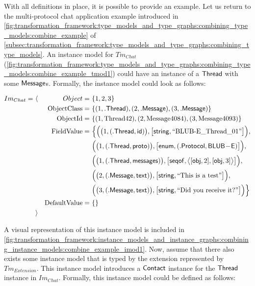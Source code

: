 With all definitions in place, it is possible to provide an example. Let us return to the multi-protocol chat application example introduced in \cref{fig:transformation_framework:type_models_and_type_graphs:combining_type_models:combine_example} of \cref{subsec:transformation_framework:type_models_and_type_graphs:combining_type_models}. An instance model for $Tm_{Chat}$ (\cref{fig:transformation_framework:type_models_and_type_graphs:combining_type_models:combine_example_tmod1}) could have an instance of a $\mathsf{Thread}$ with some $\mathsf{Message}$s. Formally, the instance model could look as follows:

\begin{align*}
Im_{Chat} =\ &\langle&
Object =\ &\{ 1, 2, 3 \} \\&&
\mathrm{ObjectClass} =\ &\{
( 1, \mathsf{.Thread} ),
( 2, \mathsf{.Message} ),
( 3, \mathsf{.Message} )
\} \\&&
\mathrm{ObjectId} =\ &\{
( 1, \text{Thread42} ),
( 2, \text{Message4084} ),
( 3, \text{Message4093} )
\} \\&&
\mathrm{FieldValue} =\ &\Big\{
\Big( \big( 1, ( \mathsf{.Thread}, \mathsf{id} ) \big), \big[ \mathsf{string}, \text{``BLUB-E\_Thread\_01''} \big] \Big),\\&&&
\Big( \big( 1, ( \mathsf{.Thread}, \mathsf{proto} ) \big), \big[ \mathsf{enum}, ( \mathsf{.Protocol}, \mathsf{BLUB\!-\!E} ) \big] \Big),\\&&&
\Big( \big( 1, ( \mathsf{.Thread}, \mathsf{messages} ) \big), \big[ \mathsf{seqof}, \big\langle [ \mathsf{obj}, 2 ], [ \mathsf{obj}, 3 ] \big\rangle \big] \Big),\\&&&
\Big( \big( 2, ( \mathsf{.Message}, \mathsf{text} ) \big), \big[ \mathsf{string}, \text{``This is a test''} \big] \Big),\\&&&
\Big( \big( 3, ( \mathsf{.Message}, \mathsf{text} ) \big), \big[ \mathsf{string}, \text{``Did you receive it?''} \big] \Big)
\Big\} \\&&
\mathrm{DefaultValue} =\ &\{\}
\\&\rangle
\end{align*}

A visual representation of this instance model is included in \cref{fig:transformation_framework:instance_models_and_instance_graphs:combining_instance_models:combine_example_imod1}. Now, assume that there also exists some instance model that is typed by the extension represented by $Tm_{Extension}$. This instance model introduces a $\mathsf{Contact}$ instance for the $\mathsf{Thread}$ instance in $Im_{Chat}$. Formally, this instance model could be defined as follows:

